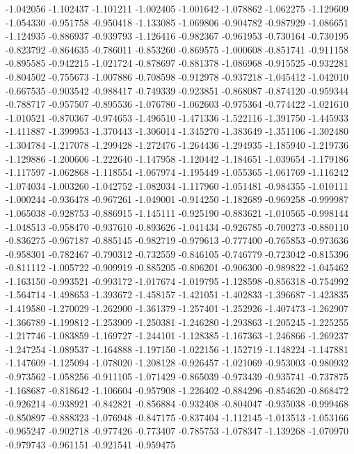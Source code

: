 -1.042056
-1.102437
-1.101211
-1.002405
-1.001642
-1.078862
-1.062275
-1.129609
-1.054330
-0.951758
-0.950418
-1.133085
-1.069806
-0.904782
-0.987929
-1.086651
-1.124935
-0.886937
-0.939793
-1.126416
-0.982367
-0.961953
-0.730164
-0.730195
-0.823792
-0.864635
-0.786011
-0.853260
-0.869575
-1.000608
-0.851741
-0.911158
-0.895585
-0.942215
-1.021724
-0.878697
-0.881378
-1.086968
-0.915525
-0.932281
-0.804502
-0.755673
-1.007886
-0.708598
-0.912978
-0.937218
-1.045412
-1.042010
-0.667535
-0.903542
-0.988417
-0.749339
-0.923851
-0.868087
-0.874120
-0.959344
-0.788717
-0.957507
-0.895536
-1.076780
-1.062603
-0.975364
-0.774422
-1.021610
-1.010521
-0.870367
-0.974653
-1.496510
-1.471336
-1.522116
-1.391750
-1.445933
-1.411887
-1.399953
-1.370443
-1.306014
-1.345270
-1.383649
-1.351106
-1.302480
-1.304784
-1.217078
-1.299428
-1.272476
-1.264436
-1.294935
-1.185940
-1.219736
-1.129886
-1.200606
-1.222640
-1.147958
-1.120442
-1.184651
-1.039654
-1.179186
-1.117597
-1.062868
-1.118554
-1.067974
-1.195449
-1.055365
-1.061769
-1.116242
-1.074034
-1.003260
-1.042752
-1.082034
-1.117960
-1.051481
-0.984355
-1.010111
-1.000244
-0.936478
-0.967261
-1.049001
-0.914250
-1.182689
-0.969258
-0.999987
-1.065038
-0.928753
-0.886915
-1.145111
-0.925190
-0.883621
-1.010565
-0.998144
-1.048513
-0.958470
-0.937610
-0.893626
-1.041434
-0.926785
-0.700273
-0.880110
-0.836275
-0.967187
-0.885145
-0.982719
-0.979613
-0.777400
-0.765853
-0.973636
-0.958301
-0.782467
-0.790312
-0.732559
-0.846105
-0.746779
-0.723042
-0.815396
-0.811112
-1.005722
-0.909919
-0.885205
-0.806201
-0.906300
-0.989822
-1.045462
-1.163150
-0.993521
-0.993172
-1.017674
-1.019795
-1.128598
-0.856318
-0.754992
-1.564714
-1.498653
-1.393672
-1.458157
-1.421051
-1.402833
-1.396687
-1.423835
-1.419580
-1.270029
-1.262900
-1.361379
-1.257401
-1.252926
-1.407473
-1.262907
-1.366789
-1.199812
-1.253909
-1.250381
-1.246280
-1.293863
-1.205245
-1.225255
-1.217746
-1.083859
-1.169727
-1.244101
-1.128385
-1.167363
-1.246866
-1.269237
-1.247254
-1.089537
-1.164888
-1.197150
-1.022156
-1.152719
-1.148224
-1.147881
-1.147609
-1.125094
-1.078020
-1.208128
-0.926457
-1.021069
-0.953003
-0.980932
-0.973562
-1.058256
-0.911105
-1.071429
-0.865039
-0.973439
-0.935741
-0.737875
-1.168687
-0.818642
-1.106604
-0.957908
-1.226402
-0.884296
-0.854620
-0.868472
-0.926214
-0.938921
-0.842821
-0.856884
-0.932408
-0.804047
-0.935038
-0.999468
-0.850897
-0.888323
-1.076948
-0.847175
-0.837404
-1.112145
-1.013513
-1.053166
-0.965247
-0.902718
-0.977426
-0.773407
-0.785753
-1.078347
-1.139268
-1.070970
-0.979743
-0.961151
-0.921541
-0.959475
